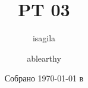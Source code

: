 \title{\huge \textbf{PT \LeC{} 03}}
\author{isagila \and ablearthy}
\date{Собрано {\ddmmyyyydate\today} в \currenttime}
\newcommand{\githublink}{https://github.com/isagila/tesc}

